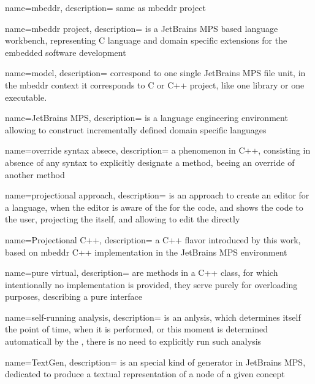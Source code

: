 {
  name=mbeddr,
  description={ same as mbeddr project}
}


{
  name=mbeddr project,
  description={ is a JetBrains MPS based language workbench, representing C language and domain specific
  extensions for the embedded software development}
}

{
  name=model,
  description={ correspond to one single JetBrains MPS file unit, in the mbeddr context it corresponds to C or C++ project, like one library or one executable.}
}

{
  name=JetBrains MPS,
  description={ is a language engineering environment 
  allowing to construct incrementally defined domain specific languages}
}

{
  name=override syntax absece,
  description={ a phenomenon in C++, consisting in absence of any syntax to explicitly designate a method, beeing an override
  of another method}
}



{
  name=projectional approach,
  description={ is an approach to create an editor for a language, when the editor is 
  aware of the  for the code, and shows the code to the user, projecting the 
   itself, and allowing to edit the  directly}
}

{
  name=Projectional C++,
  description={ a C++ flavor introduced by this work, based on mbeddr C++ implementation in the JetBrains MPS environment}
}

{
  name=pure virtual,
  description={ are methods in a C++ class, for which intentionally no implementation is provided, they serve purely for overloading purposes, 
  describing a pure interface}
}


{
  name=self-running analysis,
  description={ is an anlysis, which determines itself the point of time, when it is performed, or this moment is determined automaticall by the , 
  there is no need to explicitly run such analysis}
}


{
  name=TextGen,
  description={ is an special kind of generator in JetBrains MPS, dedicated to produce a textual representation of a node of a given concept}
}
